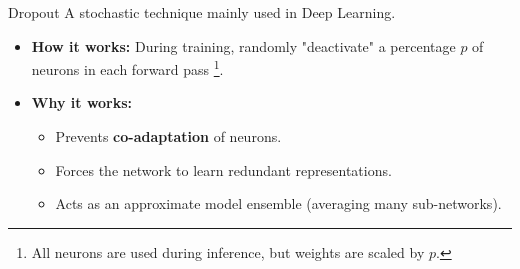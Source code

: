 \documentclass[aspectratio=169]{beamer}
\begin{document}
\begin{frame}{Dropout}
	A stochastic technique mainly used in Deep Learning.
	\vspace{0.3cm}
	\begin{itemize}
		\item \textbf{How it works:} During training, randomly "deactivate" a percentage $p$ of neurons in each forward pass \footnote{All neurons are used during inference, but weights are scaled by $p$.}.
		\item \textbf{Why it works:} 
		\begin{itemize}
			\item Prevents \textbf{co-adaptation} of neurons.
			\item Forces the network to learn redundant representations.
			\item Acts as an approximate model ensemble (averaging many sub-networks).
		\end{itemize}
	\end{itemize}
	\vspace{0.2cm}
	\centering
\end{frame}
\end{document}
